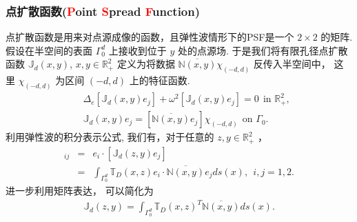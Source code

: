 \documentclass[8pt]{beamer}
\newcommand{\R}{\mathbb{R}}
\newcommand{\om}{\omega}
\newcommand{\Ga}{\Gamma}
\newcommand{\De}{\Delta}
\newcommand{\N}{\mathbb{N}}
\newcommand{\T}{\mathbb{T}}
\newcommand{\J}{\mathbb{J}}
\newcommand{\ben}{\begin{eqnarray*}}
\newcommand{\een}{\end{eqnarray*}}
\begin{document}
\begin{frame}
\frametitle{点扩散函数(\textcolor{red}{P}oint \textcolor{red}{S}pread \textcolor{red}{F}unction)}
点扩散函数是用来对点源成像的函数，且弹性波情形下的PSF是一个 $2\times2$ 的矩阵. 假设在半空间的表面 $\Ga_0^d$ 上接收到位于 $y$ 处的点源场. 于是我们将有限孔径点扩散函数 $\J_d(x,y)$, $x,y\in\R^2_+$ 定义为将数据 $\overline{\N(x,y)}\chi_{(-d,d)}$ 反传入半空间中， 这里 $\chi_{(-d,d)}$ 为区间 $(-d,d)$ 上的特征函数. 
\ben
& &\De_e[\J_d(x,y)e_j]+\om^2[\J_d(x,y)e_j]=0\ \ \mbox{in }\R^2_+,\\
& &\J_d(x,y)e_j=[\overline{\N(x,y)}e_j]\chi_{(-d,d)}\ \ \mbox{on }\Ga_0.
\een
利用弹性波的积分表示公式, 我们有，对于任意的 $z,y\in\R^2_+$ ，
\ben
[\J_d(z,y)]_{ij}&=&e_i\cdot[\J_d(z,y)e_j]\\
&=&\int_{\Ga_0^d}\T_D(x,z)e_i\cdot\overline{\N(x,y)}e_jds(x),\ \ i,j=1,2.
\een
进一步利用矩阵表达， 可以简化为
\ben\label{jd}
\J_d(z,y)=\int_{\Ga_0^d}\T_D(x,z)^T\overline{\N(x,y)}ds(x).
\een
\end{frame}
\end{document}
